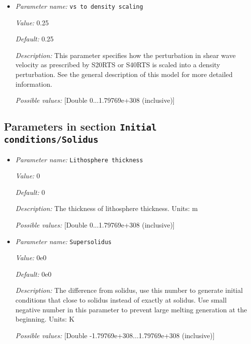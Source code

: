\begin{itemize}
{\it Default:} 2e-5


{\it Description:} The value of the thermal expansion coefficient $\beta$. Units: $1/K$.


{\it Possible values:} [Double 0...1.79769e+308 (inclusive)]
\item {\it Parameter name:} {\tt vs to density scaling}
\label{parameters:Initial conditions/S40RTS perturbation/vs to density scaling}


{\it Value:} 0.25


{\it Default:} 0.25


{\it Description:} This parameter specifies how the perturbation in shear wave velocity as prescribed by S20RTS or S40RTS is scaled into a density perturbation. See the general description of this model for more detailed information.


{\it Possible values:} [Double 0...1.79769e+308 (inclusive)]
\end{itemize}

\subsection{Parameters in section \tt Initial conditions/Solidus}
\label{parameters:Initial_20conditions/Solidus}

\begin{itemize}
\item {\it Parameter name:} {\tt Lithosphere thickness}
\label{parameters:Initial conditions/Solidus/Lithosphere thickness}


{\it Value:} 0


{\it Default:} 0


{\it Description:} The thickness of lithosphere thickness. Units: m


{\it Possible values:} [Double 0...1.79769e+308 (inclusive)]
\item {\it Parameter name:} {\tt Supersolidus}
\label{parameters:Initial conditions/Solidus/Supersolidus}


{\it Value:} 0e0


{\it Default:} 0e0


{\it Description:} The difference from solidus, use this number to generate initial conditions that close to solidus instead of exactly at solidus. Use small negative number in this parameter to prevent large melting generation at the beginning.   Units: K 


{\it Possible values:} [Double -1.79769e+308...1.79769e+308 (inclusive)]
\end{itemize}




